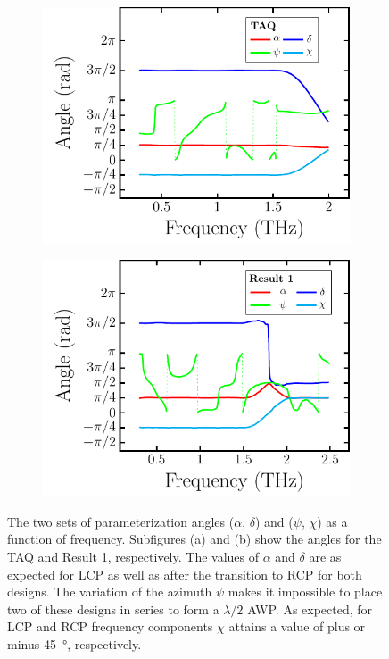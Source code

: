 \begin{figure}[ht]
    \begin{subfigure}[b]{.5\linewidth}
    \caption{}\label{}
    \centering\includegraphics[scale=0.73]{images/results/plots/ceramic/params_dotted_a.pdf}
    \end{subfigure}%
    \begin{subfigure}[b]{.5\linewidth}
    \caption{}\label{}
    \centering\includegraphics[scale=0.73]{images/results/plots/ceramic/params_dotted_b.pdf}
    \end{subfigure}
    \caption{The two sets of parameterization angles ($\alpha$, $\delta$) and ($\psi$, $\chi$) as a function of frequency. Subfigures (a) and (b) show the angles for the TAQ and Result 1, respectively. The values of $\alpha$ and $\delta$ are as expected for LCP as well as after the transition to RCP for both designs. The variation of the azimuth $\psi$ makes it impossible to place two of these designs in series to form a $\lambda/2$ AWP. As expected, for LCP and RCP frequency components $\chi$ attains a value of plus or minus \SI{45}{\degree}, respectively.}
    \label{fig:cl4_params}
\end{figure}

